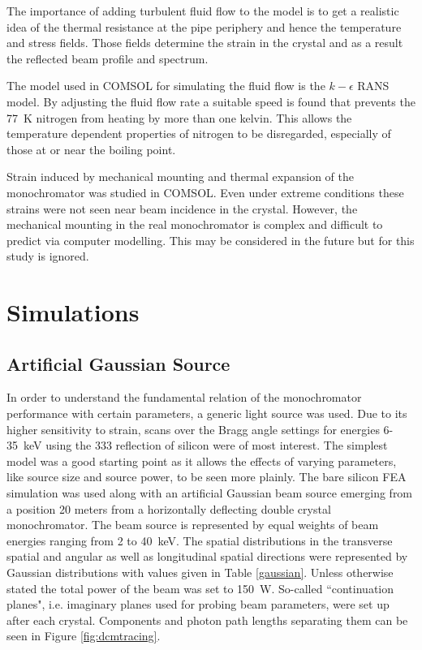 \documentclass[preprint]{iucr}              %
\begin{document}
The importance of adding turbulent fluid flow to the model is to get a realistic idea of the thermal resistance at the pipe periphery and hence the temperature and stress fields. Those fields determine the strain in the crystal and as a result the reflected beam profile and spectrum.

The model used in COMSOL for simulating the fluid flow is the $k-\epsilon$ RANS model. By adjusting the fluid flow rate a suitable speed is found that prevents the 77~K nitrogen from heating by more than one kelvin. This allows the temperature dependent properties of nitrogen to be disregarded, especially of those at or near the boiling point.\label{feamodels}

Strain induced by mechanical mounting and thermal expansion of the monochromator was studied in COMSOL. Even under extreme conditions these strains were not seen near beam incidence in the crystal. However, the mechanical mounting in the real monochromator is complex and difficult to predict via computer modelling. This may be considered in the future but for this study is ignored.

\section{Simulations}

\subsection{Artificial Gaussian Source}
In order to understand the fundamental relation of the monochromator performance with certain parameters, a generic light source was used. Due to its higher sensitivity to strain, scans over the Bragg angle settings for energies 6-35~keV using the 333 reflection of silicon were of most interest. The simplest model was a good starting point as it allows the effects of varying parameters, like source size and source power, to be seen more plainly. The bare silicon FEA simulation was used along with an artificial Gaussian beam source emerging from a position 20 meters from a horizontally deflecting double crystal monochromator. The beam source is represented by equal weights of beam energies ranging from 2 to 40~keV. The spatial distributions in the transverse spatial and angular as well as longitudinal spatial directions were represented by Gaussian distributions with values given in Table \ref{gaussian}. Unless otherwise stated the total power of the beam was set to 150~W. So-called ``continuation planes", i.e. imaginary planes used for probing beam parameters, were set up after each crystal. Components and photon path lengths separating them can be seen in Figure \ref{fig:dcmtracing}.
\end{document}
